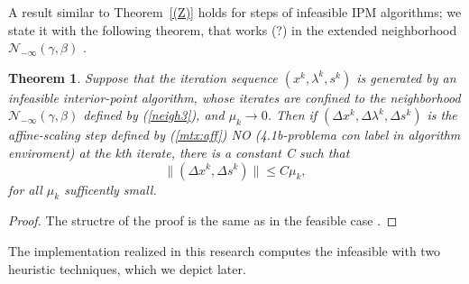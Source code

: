 \documentclass[a4paper,10 pt,titlepage,twoside]{book}
\theoremstyle{plain}
\newtheorem{thm}{Theorem}[chapter]
\theoremstyle{definition}
\theoremstyle{remark}
\begin{document}
A result similar to Theorem~\ref{(Z)} holds for steps of infeasible IPM algorithms; we state it with the following theorem, that works (?) in the extended neighborhood $\mathcal{N}_{-\infty}(\gamma,\beta)$ \cite{Wright}.\\
\begin{thm}
	Suppose that the iteration sequence $(x^{k},\lambda^{k},s^{k})$ is generated by an infeasible interior-point algorithm, whose iterates are confined to the neighborhood $\mathcal{N}_{-\infty}(\gamma,\beta)$ defined by (\ref{neigh3}), and $\mu_{k}\to 0$. Then if $(\Delta x^{k},\Delta \lambda^{k},\Delta s^{k})$ is the affine-scaling step defined by (\ref{mtx:aff}) NO (4.1b-problema con label in algorithm enviroment) at the kth iterate, there is a constant C such that
	\begin{equation*}
		\lVert(\Delta x^{k},\Delta s^{k})\rVert\leq C\mu_{k},
	\end{equation*}
	for all $\mu_{k}$ sufficently small.
\end{thm}
\begin{proof}
	The structre of the proof is the same as in the feasible case \cite{Wright}.
\end{proof}
The implementation realized in this research computes the infeasible with two heuristic techniques, which we depict later.\\
\end{document}
